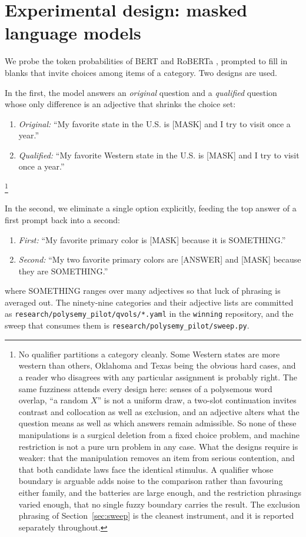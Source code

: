 \documentclass[11pt]{article}
\begin{document}
\section{Experimental design: masked language models}
\label{sec:masked}

We probe the token probabilities of BERT \cite{devlin2018} and RoBERTa
\cite{liu2019}, prompted to fill in blanks that invite choices among items
of a category. Two designs are used.

In the first, the model answers an \emph{original} question and a
\emph{qualified} question whose only difference is an adjective that
shrinks the choice set:
\begin{enumerate}
\item \emph{Original:} ``My favorite state in the U.S. is [MASK] and I try
to visit once a year.''
\item \emph{Qualified:} ``My favorite Western state in the U.S. is [MASK]
and I try to visit once a year.''
\end{enumerate}
\footnote{No qualifier partitions a category cleanly. Some Western states are
more western than others, Oklahoma and Texas being the obvious hard cases,
and a reader who disagrees with any particular assignment is probably right.
The same fuzziness attends every design here: senses of a polysemous word
overlap, ``a random $X$'' is not a uniform draw, a two-slot continuation
invites contrast and collocation as well as exclusion, and an adjective alters
what the question means as well as which answers remain admissible. So none of
these manipulations is a surgical deletion from a fixed choice problem, and
machine restriction is not a pure urn problem in any case. What the designs
require is weaker: that the manipulation removes an item from serious
contention, and that both candidate laws face the identical stimulus. A
qualifier whose boundary is arguable adds noise to the comparison rather than
favouring either family, and the batteries are large enough, and the
restriction phrasings varied enough, that no single fuzzy boundary carries the
result. The exclusion phrasing of Section~\ref{sec:sweep} is the cleanest
instrument, and it is reported separately throughout.}

In the second, we eliminate a single option explicitly, feeding the top
answer of a first prompt back into a second:
\begin{enumerate}
\item \emph{First:} ``My favorite primary color is [MASK] because it is
SOMETHING.''
\item \emph{Second:} ``My two favorite primary colors are [ANSWER] and
[MASK] because they are SOMETHING.''
\end{enumerate}
where SOMETHING ranges over many adjectives so that luck of phrasing is
averaged out. The ninety-nine categories and their adjective lists are
committed as \texttt{research/polysemy\_pilot/qvols/*.yaml} in the
\texttt{winning} repository, and the sweep that consumes them is
\texttt{research/polysemy\_pilot/sweep.py}.
\end{document}
